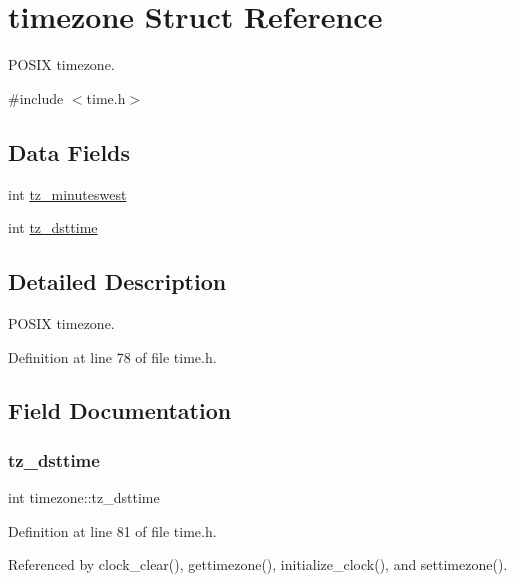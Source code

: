 \hypertarget{structtimezone}{}\section{timezone Struct Reference}
\label{structtimezone}


P\+O\+S\+IX timezone.  




{\ttfamily \#include $<$time.\+h$>$}

\subsection*{Data Fields}
\begin{DoxyCompactItemize}
\item 
int \hyperlink{structtimezone_a3042f7eff6e1b980728def76b1fa0eb7}{tz\+\_\+minuteswest}
\item 
int \hyperlink{structtimezone_a85259977aeb63b17e6ce94f19afdfd99}{tz\+\_\+dsttime}
\end{DoxyCompactItemize}


\subsection{Detailed Description}
P\+O\+S\+IX timezone. 

Definition at line 78 of file time.\+h.



\subsection{Field Documentation}
\mbox{\label{structtimezone_a85259977aeb63b17e6ce94f19afdfd99}} 
\subsubsection{\texorpdfstring{tz\+\_\+dsttime}{tz\_dsttime}}
{\footnotesize\ttfamily int timezone\+::tz\+\_\+dsttime}



Definition at line 81 of file time.\+h.



Referenced by clock\+\_\+clear(), gettimezone(), initialize\+\_\+clock(), and settimezone().

\mbox{\label{structtimezone_a3042f7eff6e1b980728def76b1fa0eb7}} 
